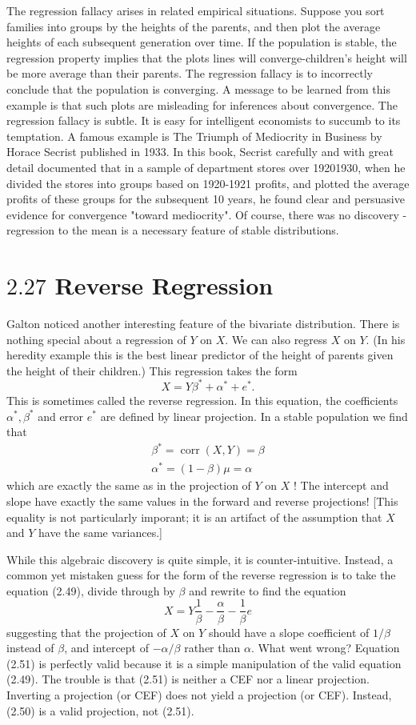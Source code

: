 \documentclass[10pt]{article}
\begin{document}
The regression fallacy arises in related empirical situations. Suppose you sort families into groups by the heights of the parents, and then plot the average heights of each subsequent generation over time. If the population is stable, the regression property implies that the plots lines will converge-children's height will be more average than their parents. The regression fallacy is to incorrectly conclude that the population is converging. A message to be learned from this example is that such plots are misleading for inferences about convergence. The regression fallacy is subtle. It is easy for intelligent economists to succumb to its temptation. A famous example is The Triumph of Mediocrity in Business by Horace Secrist published in 1933. In this book, Secrist carefully and with great detail documented that in a sample of department stores over 19201930, when he divided the stores into groups based on 1920-1921 profits, and plotted the average profits of these groups for the subsequent 10 years, he found clear and persuasive evidence for convergence "toward mediocrity". Of course, there was no discovery - regression to the mean is a necessary feature of stable distributions.

\section{$2.27$ Reverse Regression}
Galton noticed another interesting feature of the bivariate distribution. There is nothing special about a regression of $Y$ on $X$. We can also regress $X$ on $Y$. (In his heredity example this is the best linear predictor of the height of parents given the height of their children.) This regression takes the form
$$
X=Y \beta^{*}+\alpha^{*}+e^{*} .
$$
This is sometimes called the reverse regression. In this equation, the coefficients $\alpha^{*}, \beta^{*}$ and error $e^{*}$ are defined by linear projection. In a stable population we find that
$$
\begin{gathered}
\beta^{*}=\operatorname{corr}(X, Y)=\beta \\
\alpha^{*}=(1-\beta) \mu=\alpha
\end{gathered}
$$
which are exactly the same as in the projection of $Y$ on $X$ ! The intercept and slope have exactly the same values in the forward and reverse projections! [This equality is not particularly imporant; it is an artifact of the assumption that $X$ and $Y$ have the same variances.]

While this algebraic discovery is quite simple, it is counter-intuitive. Instead, a common yet mistaken guess for the form of the reverse regression is to take the equation (2.49), divide through by $\beta$ and rewrite to find the equation
$$
X=Y \frac{1}{\beta}-\frac{\alpha}{\beta}-\frac{1}{\beta} e
$$
suggesting that the projection of $X$ on $Y$ should have a slope coefficient of $1 / \beta$ instead of $\beta$, and intercept of $-\alpha / \beta$ rather than $\alpha$. What went wrong? Equation (2.51) is perfectly valid because it is a simple manipulation of the valid equation (2.49). The trouble is that (2.51) is neither a CEF nor a linear projection. Inverting a projection (or CEF) does not yield a projection (or CEF). Instead, (2.50) is a valid projection, not (2.51).
\end{document}
